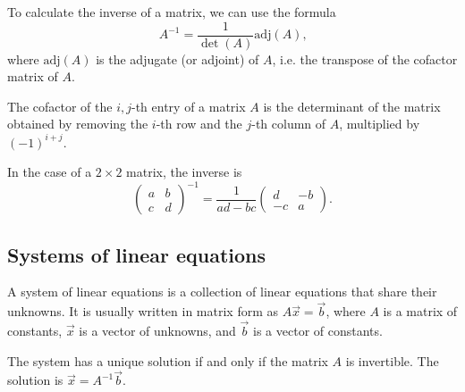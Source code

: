 To calculate the inverse of a matrix, we can use the formula
\[
  A^{-1} = \frac{1}{\det(A)} \text{adj}(A)\text{,}
\]
where $\text{adj}(A)$ is the adjugate (or adjoint) of $A$, i.e. the transpose of the cofactor matrix
of $A$.

The cofactor of the $i, j$-th entry of a matrix $A$ is the determinant of the matrix
obtained by removing the $i$-th row and the $j$-th column of $A$, multiplied by $(-1)^{i
+ j}$.

In the case of a $2 \times 2$ matrix, the inverse is
\[
  \begin{pmatrix}
    a & b \\
    c & d
  \end{pmatrix}^{-1} = \frac{1}{ad - bc}
  \begin{pmatrix}
    d & -b \\
    -c & a
  \end{pmatrix}\text{.}
\]

\subsection{Systems of linear equations}

A system of linear equations is a collection of linear equations that share their
unknowns.  It is usually written in matrix form as $A \vec{x} = \vec{b}$, where $A$ is a
matrix of constants, $\vec{x}$ is a vector of unknowns, and $\vec{b}$ is a vector of
constants.

The system has a unique solution if and only if the matrix $A$ is invertible.  The
solution is $\vec{x} = A^{-1} \vec{b}$.

